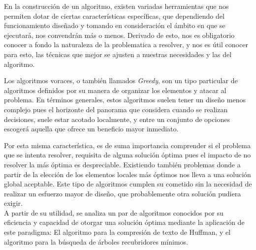 En la construcción de un algoritmo, existen variadas herramientas que nos permiten dotar de ciertas características específicas, que dependiendo del funcionamiento diseñado y tomando en consideración el ámbito en que se ejecutará, nos convendrán más o menos. Derivado de esto, nos es obligatorio conocer a fondo la naturaleza de la problematica a resolver, y nos es útil conocer para esto, las técnicas que mejor se ajusten a nuestras necesidades y las del algoritmo.

Los algoritmos voraces, o también llamados \textit{Greedy}, son un tipo particular de algoritmos definidos por su manera de organizar los elementos y atacar al problema. En términos generales, estos algoritmos suelen tener un diseño menos complejo pues el horizonte del panorama que considera cuando se realizan decisiones, suele estar acotado localmente, y entre un conjunto de opciones escogerá aquella que ofrece un beneficio mayor inmediato.

Por esta misma característica, es de suma importancia comprender si el problema que se intenta resolver, requisita de alguna solución óptima pues el impacto de no resolver la más óptima es despreciable. Existiendo también problemas donde a partir de la elección de los elementos locales más óptimos nos lleva a una solución global aceptable. Este tipo de algoritmos cumplen su cometido sin la necesidad de realizar un esfuerzo mayor de diseño, que probablemente otra solución pudiera exigir.\\

A partir de su utilidad, se analiza un par de algoritmos conocidos por su eficiencia y capacidad de otorgar una solución óptima mediante la aplicación de este paradigma: El algoritmo para la compresión de texto de Huffman, y el algoritmo para la búsqueda de árboles recubridores mínimos.
